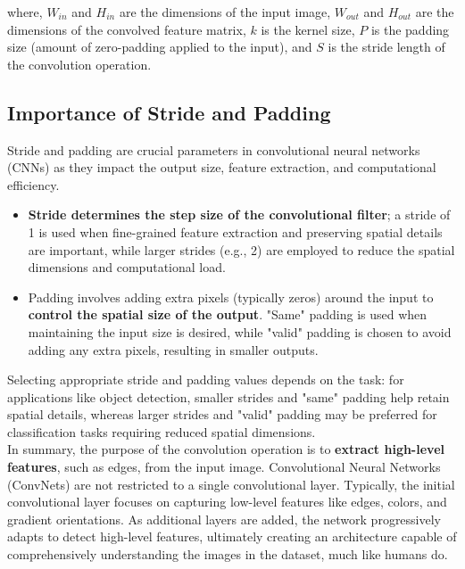 where, $W_{in}$ and $H_{in}$ are the dimensions of the input image, $W_{out}$ and $H_{out}$ are the dimensions of the convolved feature matrix, $k$ is the kernel size, $P$ is the padding size (amount of zero-padding applied to the input), and $S$ is the stride length of the convolution operation.

\subsection{Importance of Stride and Padding}
Stride and padding are crucial parameters in convolutional neural networks (CNNs) as they impact the output size, feature extraction, and computational efficiency.
\begin{itemize}
    \item \textbf{Stride determines the step size of the convolutional filter}; a stride of 1 is used when fine-grained feature extraction and preserving spatial details are important, while larger strides (e.g., 2) are employed to reduce the spatial dimensions and computational load.
    \item Padding involves adding extra pixels (typically zeros) around the input to \textbf{control the spatial size of the output}. "Same" padding is used when maintaining the input size is desired, while "valid" padding is chosen to avoid adding any extra pixels, resulting in smaller outputs.
\end{itemize}
Selecting appropriate stride and padding values depends on the task: for applications like object detection, smaller strides and "same" padding help retain spatial details, whereas larger strides and "valid" padding may be preferred for classification tasks requiring reduced spatial dimensions.\\

In summary, the purpose of the convolution operation is to \textbf{extract high-level features}, such as edges, from the input image. Convolutional Neural Networks (ConvNets) are not restricted to a single convolutional layer. Typically, the initial convolutional layer focuses on capturing low-level features like edges, colors, and gradient orientations. As additional layers are added, the network progressively adapts to detect high-level features, ultimately creating an architecture capable of comprehensively understanding the images in the dataset, much like humans do.\\

